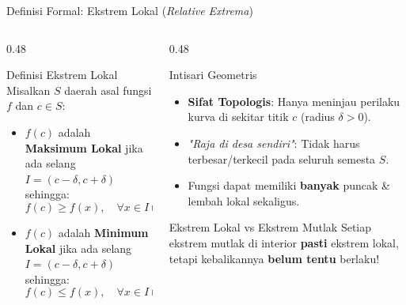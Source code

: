 \documentclass[aspectratio=43,10pt]{beamer}
\begin{document}
\begin{frame}{Definisi Formal: Ekstrem Lokal (\textit{Relative Extrema})}
    \begin{columns}[T]
        \begin{column}{0.48\textwidth}
            \begin{block}{Definisi Ekstrem Lokal}
                Misalkan $S$ daerah asal fungsi $f$ dan $c \in S$:
                \begin{itemize}
                    \item $f(c)$ adalah \textbf{Maksimum Lokal} jika ada selang $I = (c-\delta, c+\delta)$ sehingga:
                    \[
                        f(c) \ge f(x), \quad \forall x \in I \cap S
                    \]
                    \item $f(c)$ adalah \textbf{Minimum Lokal} jika ada selang $I = (c-\delta, c+\delta)$ sehingga:
                    \[
                        f(c) \le f(x), \quad \forall x \in I \cap S
                    \]
                \end{itemize}
            \end{block}
        \end{column}

        \begin{column}{0.48\textwidth}
            \begin{exampleblock}{Intisari Geometris}
                \begin{itemize}
                    \item \textbf{Sifat Topologis}: Hanya meninjau perilaku kurva di sekitar titik $c$ (radius $\delta > 0$).
                    \item \textit{"Raja di desa sendiri"}: Tidak harus terbesar/terkecil pada seluruh semesta $S$.
                    \item Fungsi dapat memiliki \textbf{banyak} puncak \& lembah lokal sekaligus.
                \end{itemize}
            \end{exampleblock}

            \begin{alertblock}{Ekstrem Lokal vs Ekstrem Mutlak}
                Setiap ekstrem mutlak di interior \textbf{pasti} ekstrem lokal, tetapi kebalikannya \textbf{belum tentu} berlaku!
            \end{alertblock}
        \end{column}
    \end{columns}
\end{frame}
\end{document}
